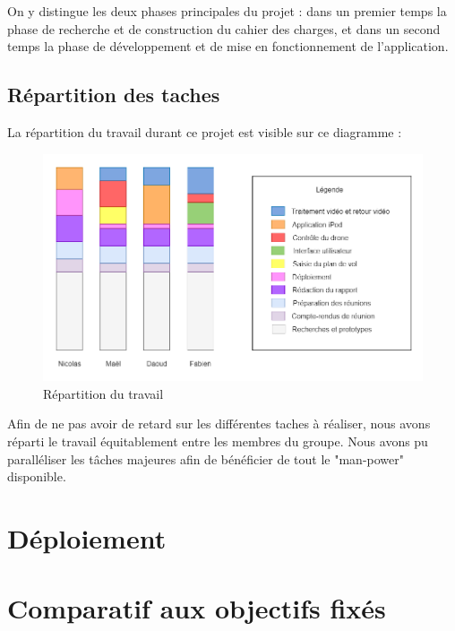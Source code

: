 \documentclass{article}
\begin{document}
    On y distingue les deux phases principales du projet : dans un premier temps la phase de recherche et de construction du cahier des charges, et dans un second temps la phase de développement et de mise en fonctionnement de l'application.
    
	\subsection{Répartition des taches}
	La répartition du travail durant ce projet est visible sur ce diagramme :
	
    \begin{center}
	\begin{figure}[!h]
	\includegraphics[scale=0.35]{repartition_taches.png}
	\caption{Répartition du travail}
	\end{figure}
    \end{center}
    
	Afin de ne pas avoir de retard sur les différentes taches à réaliser, nous avons réparti le travail équitablement entre les membres du groupe. Nous avons pu paralléliser les tâches majeures afin de bénéficier de tout le "man-power" disponible.\\
	
\section{Déploiement}


\newpage
\section{Comparatif aux objectifs fixés}
\end{document}
